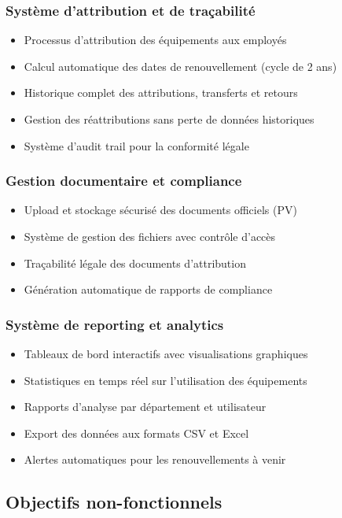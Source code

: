 \documentclass[12pt,a4paper]{report}
\begin{document}
\subsubsection{Système d'attribution et de traçabilité}
\begin{itemize}
\item Processus d'attribution des équipements aux employés
\item Calcul automatique des dates de renouvellement (cycle de 2 ans)
\item Historique complet des attributions, transferts et retours
\item Gestion des réattributions sans perte de données historiques
\item Système d'audit trail pour la conformité légale
\end{itemize}

\subsubsection{Gestion documentaire et compliance}
\begin{itemize}
\item Upload et stockage sécurisé des documents officiels (PV)
\item Système de gestion des fichiers avec contrôle d'accès
\item Traçabilité légale des documents d'attribution
\item Génération automatique de rapports de compliance
\end{itemize}

\subsubsection{Système de reporting et analytics}
\begin{itemize}
\item Tableaux de bord interactifs avec visualisations graphiques
\item Statistiques en temps réel sur l'utilisation des équipements
\item Rapports d'analyse par département et utilisateur
\item Export des données aux formats CSV et Excel
\item Alertes automatiques pour les renouvellements à venir
\end{itemize}

\subsection{Objectifs non-fonctionnels}
\end{document}
